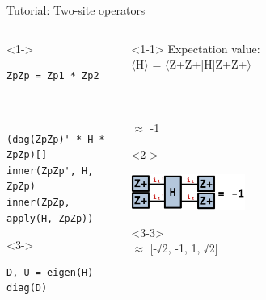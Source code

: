 \begin{frame}[fragile]{Tutorial: Two-site operators}

\begin{columns}

\begin{column}{5cm}

\begin{onlyenv}<1->
\begin{lstlisting}[language=JuliaLocal, style=julia, basicstyle=\small]
ZpZp = Zp1 * Zp2



(dag(ZpZp)' * H * ZpZp)[]
inner(ZpZp', H, ZpZp)
inner(ZpZp, apply(H, ZpZp))
\end{lstlisting}
\end{onlyenv}

\begin{onlyenv}<3->
\begin{lstlisting}[language=JuliaLocal, style=julia, basicstyle=\small]
D, U = eigen(H)
diag(D)
\end{lstlisting}
\end{onlyenv}

\end{column}

\begin{column}{5cm}

\begin{onlyenv}<1-1>
Expectation value: \\
$\langle$H$\rangle$ = $\langle$Z+Z+|H|Z+Z+$\rangle$ \\
~\\
~\\
~\\
$\approx$ -1 \\
\end{onlyenv}

\begin{onlyenv}<2->
\vspace*{0.0cm}
\begin{center}
\includegraphics[width=0.2\textwidth]{
  slides/assets/Zp1Zp2HZp1Zp2.png
}
\end{center}
\vspace*{0.0cm}
\end{onlyenv}

\begin{onlyenv}<3-3>
~\\
$\approx$ [-√2, -1, 1, √2]
\end{onlyenv}


\end{column}
\end{columns}
\end{frame}
